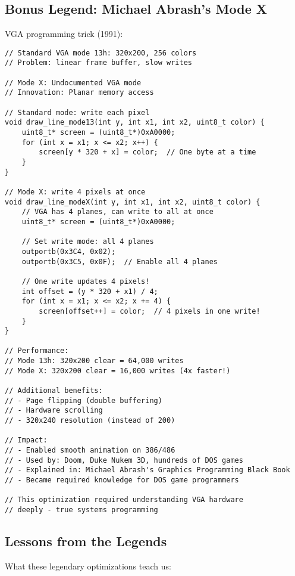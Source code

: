 \subsection{Bonus Legend: Michael Abrash's Mode X}

VGA programming trick (1991):

\begin{lstlisting}
// Standard VGA mode 13h: 320x200, 256 colors
// Problem: linear frame buffer, slow writes

// Mode X: Undocumented VGA mode
// Innovation: Planar memory access

// Standard mode: write each pixel
void draw_line_mode13(int y, int x1, int x2, uint8_t color) {
    uint8_t* screen = (uint8_t*)0xA0000;
    for (int x = x1; x <= x2; x++) {
        screen[y * 320 + x] = color;  // One byte at a time
    }
}

// Mode X: write 4 pixels at once
void draw_line_modeX(int y, int x1, int x2, uint8_t color) {
    // VGA has 4 planes, can write to all at once
    uint8_t* screen = (uint8_t*)0xA0000;

    // Set write mode: all 4 planes
    outportb(0x3C4, 0x02);
    outportb(0x3C5, 0x0F);  // Enable all 4 planes

    // One write updates 4 pixels!
    int offset = (y * 320 + x1) / 4;
    for (int x = x1; x <= x2; x += 4) {
        screen[offset++] = color;  // 4 pixels in one write!
    }
}

// Performance:
// Mode 13h: 320x200 clear = 64,000 writes
// Mode X: 320x200 clear = 16,000 writes (4x faster!)

// Additional benefits:
// - Page flipping (double buffering)
// - Hardware scrolling
// - 320x240 resolution (instead of 200)

// Impact:
// - Enabled smooth animation on 386/486
// - Used by: Doom, Duke Nukem 3D, hundreds of DOS games
// - Explained in: Michael Abrash's Graphics Programming Black Book
// - Became required knowledge for DOS game programmers

// This optimization required understanding VGA hardware
// deeply - true systems programming
\end{lstlisting}

\subsection{Lessons from the Legends}

What these legendary optimizations teach us:

